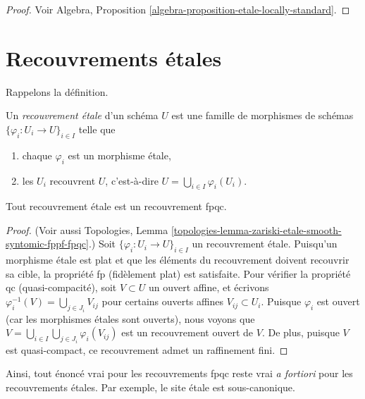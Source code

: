 \begin{proof}
Voir
Algebra, Proposition \ref{algebra-proposition-etale-locally-standard}.
\end{proof}





\section{Recouvrements \'etales}
\label{section-etale-covering}

\noindent
Rappelons la d\'efinition.

\begin{definition}
\label{definition-etale-covering}
Un {\it recouvrement \'etale} d'un sch\'ema $U$ est une famille de morphismes
de sch\'emas
$\{\varphi_i : U_i \to U\}_{i \in I}$ telle que
\begin{enumerate}
\item chaque $\varphi_i$ est un morphisme \'etale,
\item les $U_i$ recouvrent $U$, c'est-\`a-dire $U = \bigcup_{i\in I}\varphi_i(U_i)$.
\end{enumerate}
\end{definition}

\begin{lemma}
\label{lemma-etale-fpqc}
Tout recouvrement \'etale est un recouvrement fpqc.
\end{lemma}

\begin{proof}
(Voir aussi
Topologies,
Lemma \ref{topologies-lemma-zariski-etale-smooth-syntomic-fppf-fpqc}.)
Soit $\{\varphi_i : U_i \to U\}_{i \in I}$ un recouvrement \'etale.
Puisqu'un morphisme \'etale est plat et que les \'el\'ements du recouvrement doivent
recouvrir sa cible, la propri\'et\'e fp (fid\`element plat) est satisfaite.
Pour v\'erifier la propri\'et\'e qc (quasi-compacit\'e), soit $V \subset U$ un ouvert
affine, et \'ecrivons $\varphi_i^{-1}(V) = \bigcup_{j \in J_i} V_{ij}$
pour certains ouverts affines $V_{ij} \subset U_i$. Puisque $\varphi_i$ est ouvert
(car les morphismes \'etales sont ouverts), nous voyons que
$V = \bigcup_{i\in I} \bigcup_{j \in J_i} \varphi_i(V_{ij})$
est un recouvrement ouvert de $V$.
De plus, puisque $V$ est quasi-compact, ce recouvrement admet un
raffinement fini.
\end{proof}

\noindent
Ainsi, tout \'enonc\'e vrai pour les recouvrements fpqc
reste vrai {\it a fortiori} pour les recouvrements \'etales. Par
exemple, le site \'etale est sous-canonique.

